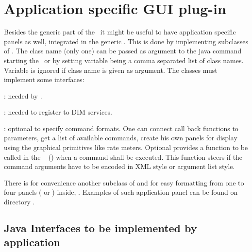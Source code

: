 \section{Application specific GUI plug-in}
Besides the generic part of the \gui~it might be useful to have application specific panels as well, integrated in the generic \gui. This is done by implementing subclasses of  . The class name (only one) can be passed as argument to the java command starting the \gui~or by setting variable  being a comma separated list of class names.
Variable is ignored if class name is given as argument.
The classes must implement some interfaces:
\bdes
\item [\class{xiUserPanel}]: needed by \gui.
\item [\class{xiUserInfoHandler}]: needed to register to DIM services.
\item [\class{xiUserCommand}]: optional to specify command formats.
\edes
One can connect call back functions to parameters, 
get a list of available commands,
create his own panels for display using the graphical primitives like rate meters.
Optional  provides a function to be called in the \gui~
() when a command shall be executed. This function steers if the command arguments have to be
encoded in XML style or argument list style.

There is for convenience another subclass of  and  for easy formatting from one to four panels 
( or ) inside,
.
Examples of such application panel can be found on directory .
\subsection{Java Interfaces to be implemented by application}
